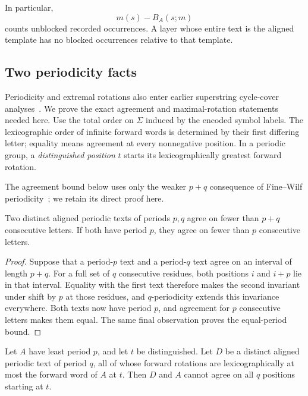 In particular,
\begin{equation}\label{eq:unblocked-count}
m(s)-B_A(s;m)
\end{equation}
counts unblocked recorded occurrences. A layer whose entire text is the aligned template has no blocked occurrences relative to that template.

\subsection{Two periodicity facts}

Periodicity and extremal rotations also enter earlier superstring cycle-cover analyses~\cite{breslauer1997,mucha2013}. We prove the exact agreement and maximal-rotation statements needed here. Use the total order on $\Sigma$ induced by the encoded symbol labels. The lexicographic order of infinite forward words is determined by their first differing letter; equality means agreement at every nonnegative position. In a periodic group, a \emph{distinguished position} $t$ starts its lexicographically greatest forward rotation.

The agreement bound below uses only the weaker $p+q$ consequence of
Fine--Wilf periodicity~\cite{finewilf}; we retain its direct proof here.

\begin{lemma}\label{lem:agreement}
Two distinct aligned periodic texts of periods $p,q$ agree on fewer than $p+q$ consecutive letters. If both have period $p$, they agree on fewer than $p$ consecutive letters.
\end{lemma}

\begin{proof}
Suppose that a period-$p$ text and a period-$q$ text agree on an interval of length $p+q$. For a full set of $q$ consecutive residues, both positions $i$ and $i+p$ lie in that interval. Equality with the first text therefore makes the second invariant under shift by $p$ at those residues, and $q$-periodicity extends this invariance everywhere. Both texts now have period $p$, and agreement for $p$ consecutive letters makes them equal. The same final observation proves the equal-period bound.
\end{proof}

\begin{lemma}\label{lem:max-rotation}
Let $A$ have least period $p$, and let $t$ be distinguished. Let $D$ be a distinct aligned periodic text of period $q$, all of whose forward rotations are lexicographically at most the forward word of $A$ at $t$. Then $D$ and $A$ cannot agree on all $q$ positions starting at $t$.
\end{lemma}

